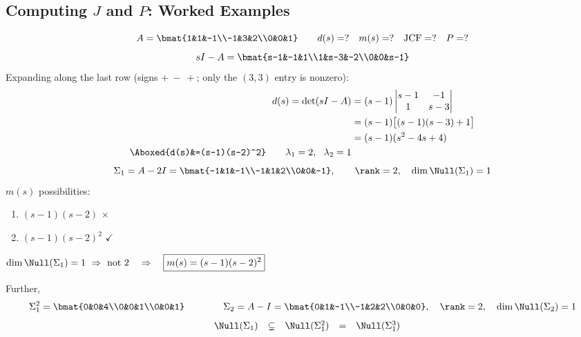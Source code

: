 \subsection{Computing \texorpdfstring{$J$}{J} and \texorpdfstring{$P$}{P}: Worked Examples}\label{ss:jordan-examples}
\begin{example}
\[
A=\bmat{1&1&-1\\-1&3&2\\0&0&1}
\qquad d(s)=?\quad m(s)=?\quad \text{JCF}=?\quad P=?
\]
\[
sI-A=\bmat{s-1&-1&1\\1&s-3&-2\\0&0&s-1}
\]
Expanding along the last row (signs $+\ -\ +$; only the $(3,3)$ entry is nonzero):
\begin{align*}
d(s)=\det(sI-A)&=(s-1)\begin{vmatrix}s-1&-1\\1&s-3\end{vmatrix}\\
&=(s-1)\big[(s-1)(s-3)+1\big]\\
&=(s-1)(s^2-4s+4)\\
\Aboxed{d(s)&=(s-1)(s-2)^2} \qquad \lambda_1=2,\ \ \lambda_2=1
\end{align*}
\[
\Sigma_1=A-2I=\bmat{-1&1&-1\\-1&1&2\\0&0&-1},\qquad \rank=2,\quad \dim\Null(\Sigma_1)=1
\]
$m(s)$ possibilities:
\begin{enumerate}[label=\arabic*-,nosep]
\item $(s-1)(s-2)$ \quad $\times$
\item $(s-1)(s-2)^2$ \quad $\checkmark$
\end{enumerate}
\begin{center}
$\dim\Null(\Sigma_1)=1\ \Rightarrow\ \text{not }2\quad\Rightarrow\quad
\boxed{m(s)=(s-1)(s-2)^2}$
\end{center}
Further,
\[
\Sigma_1^2=\bmat{0&0&4\\0&0&1\\0&0&1}
\qquad\qquad
\Sigma_2=A-I=\bmat{0&1&-1\\-1&2&2\\0&0&0},\quad \rank=2,\quad \dim\Null(\Sigma_2)=1
\]
\[
\begin{array}{r@{\quad}ccccc}
 & \Null(\Sigma_1) & \subsetneq & \Null(\Sigma_1^2) & = & \Null(\Sigma_1^3)\\

\end{array}\]
\end{example}
